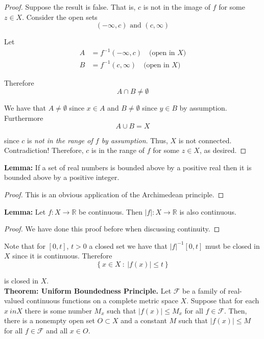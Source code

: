 \documentclass[12pt]{article}
\newlength\tindent
\renewcommand{\indent}{\hspace*{\tindent}}
\newcommand{\R}{\mathbb R}
\begin{document}
\begin{proof} Suppose the result is false. That is, $c$ is not in the image of $f$ for some $z \in X$. Consider the open sets
\begin{equation*}
	(-\infty, c) \text{ and } (c, \infty)
\end{equation*}

Let
\begin{align*}
	A &= f^{-1}(-\infty, c) \quad \text{(open in $X$)} \\
	B &= f^{-1}(c,\infty) \quad \text{(open in $X$)}
\end{align*}

Therefore
\begin{equation*}
	A \cap B \neq \emptyset
\end{equation*}

We have that $A \neq \emptyset$ since $x \in A$ and $B \neq \emptyset$ since $y \in B$ by assumption. Furthermore
\begin{equation*}
	A \cup B = X
\end{equation*}

since $c$ is {\em not in the range of $f$ by assumption}. Thus, $X$ is not connected. Contradiction! Therefore, $c$ is in the range of $f$ for some $z \in X$, as desired.
\end{proof}

%
%
{\bf Lemma:} If a set of real numbers is bounded above by a positive real then it is bounded above by a positive integer.

\begin{proof} This is an obvious application of the Archimedean principle.
\end{proof}

%
%
{\bf Lemma:} Let $f:X\to\R$ be continuous. Then $|f|:X\to\R$ is also continuous. 

\begin{proof} We have done this proof before when discussing continuity.
\end{proof}

\indent Note that for $[0,t]$, $t > 0$ a closed set we have that $|f|^{-1}[0,t]$ must be closed in $X$ since it is continuous. Therefore
\begin{equation*}
	\left\{ x \in X ~:~ |f(x)| \leq t\right\} 
\end{equation*}

is closed in $X$. \\

%
%
{\bf Theorem: Uniform Boundedness Principle.} Let $\mathcal F$ be a family of real-valued continuous functions on a complete metric space $X$. Suppose that for each $x\ in X$ there is some number $M_x$ such that $|f(x)| \leq M_x$ for all $f \in \mathcal F$. Then, there is a nonempty open set $O \subset X$ and a constant $M$ such that $|f(x)| \leq M$ for all $f \in \mathcal F$ and all $x \in O$. \\
\end{document}

